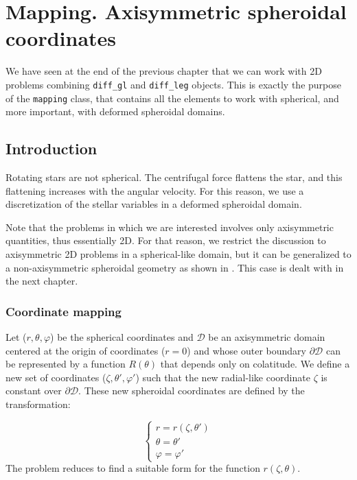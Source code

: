 \chapter{Mapping. Axisymmetric spheroidal
coordinates}\label{chap:mapping2D}

We have seen at the end of the previous chapter that we can work with
2D problems combining {\tt diff\_gl} and {\tt diff\_leg} objects. This
is exactly the purpose of the {\tt mapping} class, that contains all
the elements to work with spherical, and more important, with deformed
spheroidal domains.

\section{Introduction}

Rotating stars are not spherical. The centrifugal force flattens the
star, and this flattening increases with the angular velocity. For this
reason, we use a discretization of the stellar variables in a deformed
spheroidal domain.

Note that the problems in which we are interested involves only
axisymmetric quantities, thus essentially 2D. For that reason, we
restrict the discussion to axisymmetric 2D problems in a spherical-like
domain, but it can be generalized to a non-axisymmetric spheroidal
geometry as shown in \cite{BGM98}. This case is dealt with in the next
chapter.

\subsection{Coordinate mapping}
\label{sect:mapping}

Let ($r,\theta,\varphi$) be the spherical coordinates
and $\mathcal{D}$ be an axisymmetric domain
centered at the origin of coordinates ($r=0$) and whose outer boundary
$\partial\mathcal{D}$ can be represented by a function $R(\theta)$
that depends only on colatitude. We define a new set of coordinates
($\zeta,\theta',\varphi'$) such that the new radial-like coordinate
$\zeta$ is constant over $\partial\mathcal{D}$. These new spheroidal
coordinates are defined by the transformation:

\begin{equation}
\left\{
\begin{array}{l}
r=r(\zeta,\theta')\\
\theta=\theta'\\
\varphi=\varphi'
\end{array}
\right.
\label{themap}
\end{equation}
The problem reduces to find a suitable form for the function
$r(\zeta,\theta)$.

